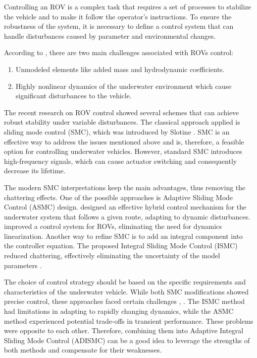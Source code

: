 Controlling an ROV is a complex task that requires a set of processes to stabilize the vehicle and 
to make it follow the operator's instructions. To ensure the robustness of the system, it is 
necessary to define a control system that can handle disturbances caused by parameter and 
environmental changes.

According to \cite{overview}, there are two main challenges associated with ROVs control:
\begin{enumerate}
\item Unmodeled elements like added mass and hydrodynamic coefficients.
\item Highly nonlinear dynamics of the underwater environment which cause significant disturbances to the vehicle.
\end{enumerate}

The recent research on ROV control showed several schemes that can achieve robust stability under 
variable disturbances. The classical approach applied is sliding mode control (SMC), which was 
introduced by Slotine \cite{slotine}. SMC is an effective way to address the issues mentioned above and is, 
therefore, a feasible option for controlling underwater vehicles. However,
standard SMC introduces high-frequency signals, which can cause actuator switching and consequently 
decrease its lifetime.

The modern SMC interpretations keep the main advantages, 
thus removing the chattering effects. One of the possible approaches is Adaptive Sliding Mode Control 
(ASMC) design. \cite{fossen:control} designed an effective hybrid control mechanism for the underwater system that 
follows a given route, adapting to dynamic disturbances. \cite{adaptive_smc} improved a control system for ROVs, 
eliminating the need for dynamics linearization. Another way to refine SMC is to add an integral 
component into the controller equation. The proposed Integral Sliding Mode Control (ISMC) reduced 
chattering, effectively eliminating the uncertainty of the model parameters \cite{integral_smc}.

The choice of control strategy should be based on the specific 
requirements and characteristics of the underwater vehicle. While both SMC modifications showed 
precise control, these approaches faced certain challenges \cite{integral_smc}, \cite{adaptive_smc}. The ISMC method had limitations in adapting to rapidly changing dynamics, while the ASMC method experienced potential trade-offs in transient performance. 
These problems were opposite to each other. Therefore, combining them into Adaptive Integral Sliding 
Mode Control (ADISMC) can be a good idea to leverage the strengths of both methods and compensate 
for their weaknesses.

